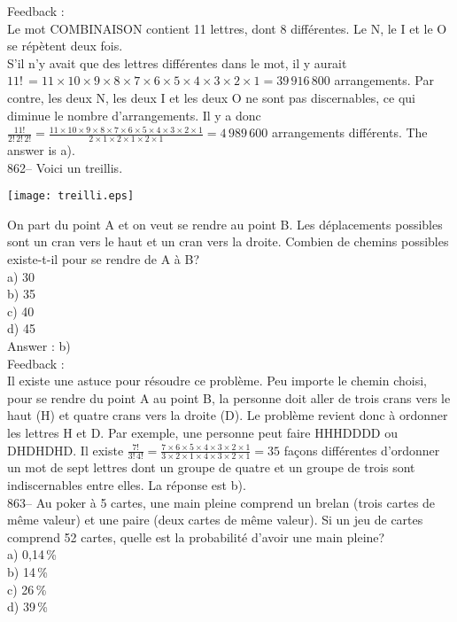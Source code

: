 ﻿\documentclass[letterpaper, 12pt]{article}
\begin{document}
Feedback : \\
Le mot COMBINAISON contient 11 lettres, dont 8 diff\'erentes.  Le N, le I et
le O se r\'ep\`etent deux fois.\\
S'il n'y avait que des lettres diff\'erentes dans le mot, il y aurait
$11!\,=11\times10\times9\times8\times7\times6\times5\times4\times3\times2\times1=39\,916\,800$
arrangements.  Par contre, les deux N, les deux I et les deux O ne sont pas
discernables, ce qui diminue le nombre d'arrangements.  Il y a donc
$\frac{11!}{2!\,2!\,2!}=\frac{11\times10\times9\times8\times7\times6\times5\times4\times3\times2\times1}{2\times1\times2\times1\times2\times1}=4\,989\,600$
arrangements diff\'erents.  The answer is a).\\

862-- Voici un treillis.    \begin{center}
    \texttt{[image: treilli.eps]}
    \end{center}
On part du point A et on veut se rendre au point B.  Les d\'eplacements
possibles sont un cran vers le haut et un cran vers la droite.  Combien de
chemins possibles existe-t-il pour se rendre de A \`a B?\\
a) 30\\
b) 35\\
c) 40\\
d) 45\\

Answer : b)\\

Feedback : \\
Il existe une astuce pour r\'esoudre ce probl\`eme. Peu importe le chemin
choisi, pour se rendre du point A au point B, la personne doit aller de
trois crans vers le haut (H) et quatre crans vers la droite (D).  Le
probl\`eme revient donc \`a ordonner les lettres H et D.  Par exemple, une
personne peut faire HHHDDDD ou DHDHDHD.  Il existe
$\frac{7!}{3!\,4!}=\frac{7\times6\times5\times4\times3\times2\times1}{3\times2\times1\times4\times3\times2\times1}=35$
fa\c cons diff\'erentes d'ordonner un mot de sept lettres dont un groupe de
quatre et un groupe de trois sont indiscernables entre elles. La r\'eponse
est b).\\

863-- Au poker \`a 5 cartes, une main pleine comprend un brelan (trois
cartes de m\^eme valeur) et une paire (deux cartes de m\^eme valeur).  Si un
jeu de cartes comprend 52 cartes, quelle est la probabilit\'e d'avoir une
main pleine?\\
a) 0,14\,\%\\
b) 14\,\%\\
c) 26\,\%\\
d) 39\,\%\\
\end{document}
